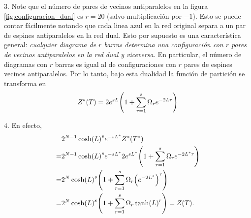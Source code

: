 \documentclass{article}
\begin{document}
3. Note que el número de pares de vecinos antiparalelos en la figura \ref{fig:configuracion_dual} es $r=20$ (salvo multiplicación por $-1$). Esto se puede contar fácilmente notando que cada linea azul en la red original separa a un par de espines antiparalelos en la red dual. Esto por supuesto es una característica general: \textit{cualquier diagrama de $r$ barras determina una configuración con $r$ pares de vecinos antiparalelos en la red dual y viceversa.} En particular, el número de diagramas con $r$ barras es igual al de configuraciones con $r$ pares de espines vecinos antiparalelos. Por lo tanto, bajo esta dualidad la función de partición se transforma en
\begin{equation}
Z^*(T)=2e^{sL}\qty(1+\sum_{r=1}^s\Omega_re^{-2Lr})
\end{equation}

4. En efecto,
\begin{align}
\begin{split}
&2^{N-1}\cosh(L)^se^{-sL^*}Z^*(T^*)\\
=&2^{N-1}\cosh(L)^se^{-sL^*}2e^{sL^*}\qty(1+\sum_{r=1}^s\Omega_re^{-2L^*r})\\
=&2^N\cosh(L)^s\qty(1+\sum_{r=1}^s\Omega_r\qty(e^{-2L^*})^r)\\
=&2^N\cosh(L)^s\qty(1+\sum_{r=1}^s\Omega_r\tanh(L)^r)=Z(T).
\end{split}
\end{align}
\end{document}
